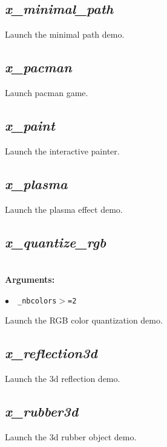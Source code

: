 \documentclass[a4paper,10.5pt,twoside]{book}
\newcommand{\Cb}[1]{\textcolor{cb}{#1}}
\begin{document}
\subsection{\emph{x\_minimal\_path} }\vspace*{-0.7em}
Launch the minimal path demo.


\subsection{\emph{x\_pacman} }\vspace*{-0.7em}
Launch pacman game.


\subsection{\emph{x\_paint} }\vspace*{-0.7em}
Launch the interactive painter.


\subsection{\emph{x\_plasma} }\vspace*{-0.7em}
Launch the plasma effect demo.


\subsection{\emph{x\_quantize\_rgb} }\vspace*{-0.7em}
~\\\textbf{\Cb{Arguments: }}\begin{flushleft}
{\small \Cb{\hspace*{0.5cm}$\bullet$~~\texttt{\_nbcolors$>$=2}}}\end{flushleft}
Launch the RGB color quantization demo.


\subsection{\emph{x\_reflection3d} }\vspace*{-0.7em}
Launch the 3d reflection demo.


\subsection{\emph{x\_rubber3d} }\vspace*{-0.7em}
Launch the 3d rubber object demo.
\end{document}
